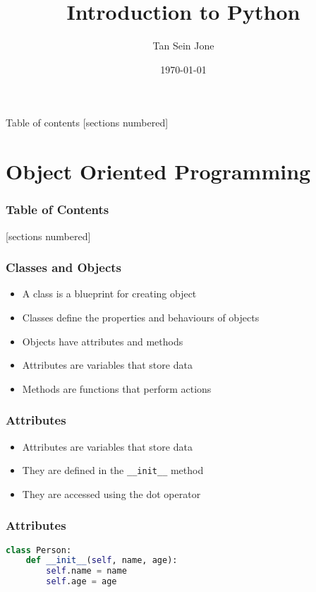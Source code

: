 \documentclass[serif, 9pt, aspectratio=32]{beamer}
\title{Introduction to Python}
\date{\today}
\author{Tan Sein Jone}
\institute{University of British Columbia}
\begin{document}
\maketitle

\begin{frame}{Table of contents}
    [sections numbered]
    \tableofcontents[hideallsubsections]
\end{frame}

\section{Object Oriented Programming}

\begin{frame}
    \frametitle{Table of Contents}
    [sections numbered]
    \tableofcontents[currentsection]
\end{frame}

\begin{frame}
    \centering
    \frametitle{Classes and Objects}
    \begin{itemize}
        \setlength{\itemsep}{2em}
        \item A class is a blueprint for creating object
        \item Classes define the properties and behaviours of objects
        \item Objects have attributes and methods
        \item Attributes are variables that store data
        \item Methods are functions that perform actions
    \end{itemize}
\end{frame}

\begin{frame}
    \centering
    \frametitle{Attributes}
    \begin{itemize}
        \setlength{\itemsep}{2em}
        \item Attributes are variables that store data
        \item They are defined in the \texttt{\_\_init\_\_} method
        \item They are accessed using the dot operator
    \end{itemize}
\end{frame}

\begin{frame}[fragile]
    \frametitle{Attributes}
    \begin{lstlisting}[language=Python]
class Person:
    def __init__(self, name, age):
        self.name = name
        self.age = age
    \end{lstlisting}
\end{frame}
\end{document}
